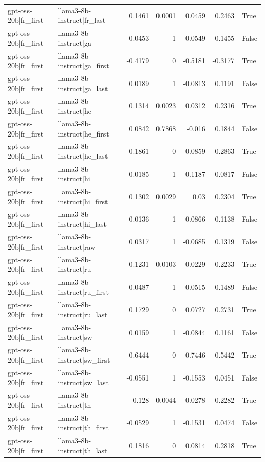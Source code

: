 \begin{table}
\begin{tabular}{l l r r r r l}
gpt-oss-20b|fr_first & llama3-8b-instruct|fr_last & 0.1461 & 0.0001 & 0.0459 & 0.2463 & True \\
gpt-oss-20b|fr_first & llama3-8b-instruct|ga & 0.0453 & 1 & -0.0549 & 0.1455 & False \\
gpt-oss-20b|fr_first & llama3-8b-instruct|ga_first & -0.4179 & 0 & -0.5181 & -0.3177 & True \\
gpt-oss-20b|fr_first & llama3-8b-instruct|ga_last & 0.0189 & 1 & -0.0813 & 0.1191 & False \\
gpt-oss-20b|fr_first & llama3-8b-instruct|he & 0.1314 & 0.0023 & 0.0312 & 0.2316 & True \\
gpt-oss-20b|fr_first & llama3-8b-instruct|he_first & 0.0842 & 0.7868 & -0.016 & 0.1844 & False \\
gpt-oss-20b|fr_first & llama3-8b-instruct|he_last & 0.1861 & 0 & 0.0859 & 0.2863 & True \\
gpt-oss-20b|fr_first & llama3-8b-instruct|hi & -0.0185 & 1 & -0.1187 & 0.0817 & False \\
gpt-oss-20b|fr_first & llama3-8b-instruct|hi_first & 0.1302 & 0.0029 & 0.03 & 0.2304 & True \\
gpt-oss-20b|fr_first & llama3-8b-instruct|hi_last & 0.0136 & 1 & -0.0866 & 0.1138 & False \\
gpt-oss-20b|fr_first & llama3-8b-instruct|raw & 0.0317 & 1 & -0.0685 & 0.1319 & False \\
gpt-oss-20b|fr_first & llama3-8b-instruct|ru & 0.1231 & 0.0103 & 0.0229 & 0.2233 & True \\
gpt-oss-20b|fr_first & llama3-8b-instruct|ru_first & 0.0487 & 1 & -0.0515 & 0.1489 & False \\
gpt-oss-20b|fr_first & llama3-8b-instruct|ru_last & 0.1729 & 0 & 0.0727 & 0.2731 & True \\
gpt-oss-20b|fr_first & llama3-8b-instruct|sw & 0.0159 & 1 & -0.0844 & 0.1161 & False \\
gpt-oss-20b|fr_first & llama3-8b-instruct|sw_first & -0.6444 & 0 & -0.7446 & -0.5442 & True \\
gpt-oss-20b|fr_first & llama3-8b-instruct|sw_last & -0.0551 & 1 & -0.1553 & 0.0451 & False \\
gpt-oss-20b|fr_first & llama3-8b-instruct|th & 0.128 & 0.0044 & 0.0278 & 0.2282 & True \\
gpt-oss-20b|fr_first & llama3-8b-instruct|th_first & -0.0529 & 1 & -0.1531 & 0.0474 & False \\
gpt-oss-20b|fr_first & llama3-8b-instruct|th_last & 0.1816 & 0 & 0.0814 & 0.2818 & True \\

\end{tabular}
\end{table}
